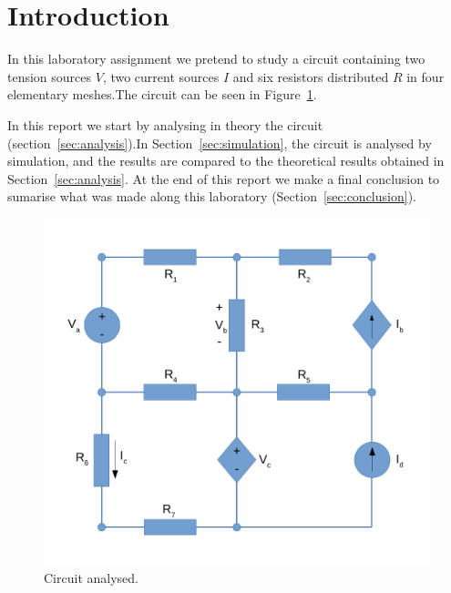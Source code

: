 \section{Introduction}
\label{sec:introduction}

In this laboratory assignment we pretend to study a circuit containing two tension sources $V$, two current sources $I$ and six resistors distributed $R$ in four elementary meshes.The circuit can be seen in Figure~\ref{fig:Circuit_Base}.

In this report we start by analysing in theory the circuit (section~\ref{sec:analysis}).In Section~\ref{sec:simulation}, the circuit is analysed by
simulation, and the results are compared to the theoretical results obtained in
Section~\ref{sec:analysis}. At the end of this report we make a final conclusion to sumarise what was made along this laboratory 
(Section~\ref{sec:conclusion}).

\begin{figure}[h] \centering
\includegraphics[width=0.5\linewidth]{Circuit.pdf}
\caption{Circuit analysed.}
\label{fig:Circuit_Base}
\end{figure}

